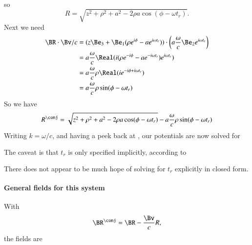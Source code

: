 {\begin{equation}
\begin{aligned}
\end{aligned}
\end{equation}
so
\begin{equation}\label{eqn:relativisticElectrodynamicsExamReflection:130}
R = \sqrt{z^2 + \rho^2 + a^2 - 2 \rho a \cos( \phi - \omega t_r ) }.
\end{equation}
Next we need
%
\begin{equation}\label{eqn:relativisticElectrodynamicsExamReflection:1070}
\begin{aligned}
\BR \cdot \Bv/c
&=
(z \Be_3 + \Be_1 (\rho e^{i \phi} - a e^{i \omega t_r} )) \cdot
\left(a \frac{\omega}{c} \Be_2 e^{i \omega t_r} \right) \\
&=
a \frac{\omega }{c}
\Real(
i (\rho e^{-i \phi} - a e^{-i \omega t_r} ) e^{i \omega t_r} ) \\
&=
a \frac{\omega }{c}
\rho \Real( i e^{-i \phi + i \omega t_r} ) \\
&=
a \frac{\omega }{c}
\rho \sin(\phi - \omega t_r)
\end{aligned}
\end{equation}
%
So we have
%
\begin{equation}\label{eqn:relativisticElectrodynamicsExamReflection:150}
R^\conj = \sqrt{z^2 + \rho^2 + a^2 - 2 \rho a \cos( \phi - \omega t_r ) }
-a \frac{\omega }{c} \rho \sin(\phi - \omega t_r)
\end{equation}
%
Writing \(k = \omega/c\), and having a peek back at , our potentials are now solved for

The caveat is that \(t_r\) is only specified implicitly, according to

There does not appear to be much hope of solving for \(t_r\) explicitly in closed form.
%
%
\paragraph{General fields for this system}
%
With
%
\begin{equation}\label{eqn:relativisticElectrodynamicsExamReflection:540}
\BR^\conj = \BR - \frac{\Bv}{c} R,
\end{equation}
the fields are

}
